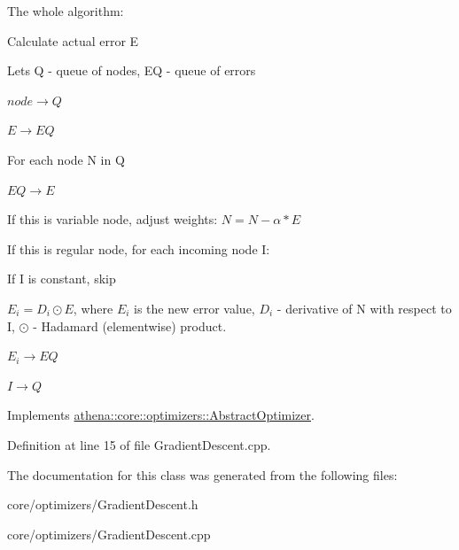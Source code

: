 The whole algorithm\+: 
\begin{DoxyEnumerate}
\item Calculate actual error E  
\item Let\textquotesingle{}s Q -\/ queue of nodes, EQ -\/ queue of errors 
\begin{DoxyEnumerate}
\item $ node \rightarrow Q $  
\item $ E \rightarrow EQ $  
\end{DoxyEnumerate}
\item For each node N in Q 
\begin{DoxyEnumerate}
\item $ EQ \rightarrow E $  
\item If this is variable node, adjust weights\+: $ N = N - \alpha * E $  
\item If this is regular node, for each incoming node I\+: 
\begin{DoxyEnumerate}
\item If I is constant, skip  
\item $ E_i = D_i \odot E $, where $ E_i $ is the new error value, $ D_i $ -\/ derivative of N with respect to I, $ \odot $ -\/ Hadamard (elementwise) product.  
\item $ E_i \rightarrow EQ $  
\item $ I \rightarrow Q $  
\end{DoxyEnumerate}
\end{DoxyEnumerate}
\end{DoxyEnumerate}

Implements \mbox{\hyperlink{classathena_1_1core_1_1optimizers_1_1_abstract_optimizer}{athena\+::core\+::optimizers\+::\+Abstract\+Optimizer}}.



Definition at line 15 of file Gradient\+Descent.\+cpp.



The documentation for this class was generated from the following files\+:\begin{DoxyCompactItemize}
\item 
core/optimizers/Gradient\+Descent.\+h\item 
core/optimizers/Gradient\+Descent.\+cpp\end{DoxyCompactItemize}
